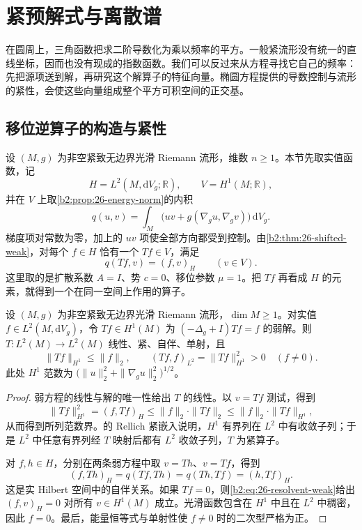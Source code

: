 \section{紧预解式与离散谱}
\label{b2:sec:2605}

在圆周上，三角函数把求二阶导数化为乘以频率的平方。一般紧流形没有统一的直线坐标，因而也没有现成的指数函数。我们可以反过来从方程寻找它自己的频率：先把源项送到解，再研究这个解算子的特征向量。椭圆方程提供的导数控制与流形的紧性，会使这些向量组成整个平方可积空间的正交基。

\subsection{移位逆算子的构造与紧性}
\label{b2:subsec:260501}

设 \((M,g)\) 为非空紧致无边界光滑 Riemann 流形，维数 \(n\geq1\)。本节先取实值函数，记
\[
 H=L^2(M,\mathrm dV_g;\mathbb R),\qquad V=H^1(M;\mathbb R),
\]
并在 \(V\) 上取\cref{b2:prop:26-energy-norm}的内积
\[
 q(u,v)=\int_M\bigl(uv+g(\nabla_g u,\nabla_g v)\bigr)\,\mathrm dV_g.
\]
梯度项对常数为零，加上的 \(uv\) 项使全部方向都受到控制。由\cref{b2:thm:26-shifted-weak}，对每个 \(f\in H\) 恰有一个 \(Tf\in V\)，满足
\begin{equation}\label{b2:eq:26-resolvent-weak}
 q(Tf,v)=(f,v)_H\qquad(v\in V).
\end{equation}
这里取的是扩散系数 \(A=I\)、势 \(c=0\)、移位参数 \(\mu=1\)。把 \(Tf\) 再看成 \(H\) 的元素，就得到一个在同一空间上作用的算子。

\begin{proposition}[正移位解算子的紧性]\label{b2:prop:26-compact-resolvent}
设 \((M,g)\) 为非空紧致无边界光滑 Riemann 流形，\(\dim M\geq1\)。对实值 \(f\in L^2(M,\mathrm dV_g)\)，令 \(Tf\in H^1(M)\) 为 \((-\Delta_g+I)Tf=f\) 的弱解。则 \(T:L^2(M)\rightarrow L^2(M)\) 线性、紧、自伴、单射，且
\[
 \|Tf\|_{H^1}\leq\|f\|_2,\qquad
 (Tf,f)_{L^2}=\|Tf\|_{H^1}^2>0\quad(f\ne0).
\]
此处 \(H^1\) 范数为 \(\bigl(\|u\|_2^2+\|\nabla_g u\|_2^2\bigr)^{1/2}\)。
\end{proposition}
\begin{proof}
弱方程的线性与解的唯一性给出 \(T\) 的线性。以 \(v=Tf\) 测试，得到
\[
 \|Tf\|_{H^1}^2=(f,Tf)_H
 \leq\|f\|_2\cdot\|Tf\|_2
 \leq\|f\|_2\cdot\|Tf\|_{H^1},
\]
从而得到所列范数界。的 Rellich 紧嵌入说明，\(H^1\) 有界列在 \(L^2\) 中有收敛子列；于是 \(L^2\) 中任意有界列经 \(T\) 映射后都有 \(L^2\) 收敛子列，\(T\) 为紧算子。

对 \(f,h\in H\)，分别在两条弱方程中取 \(v=Th\)、\(v=Tf\)，得到
\[
 (f,Th)_H=q(Tf,Th)=q(Th,Tf)=(h,Tf)_H.
\]
这是实 Hilbert 空间中的自伴关系。如果 \(Tf=0\)，则\eqref{b2:eq:26-resolvent-weak}给出 \((f,v)_H=0\) 对所有 \(v\in H^1(M)\) 成立。光滑函数包含在 \(H^1\) 中且在 \(L^2\) 中稠密，因此 \(f=0\)。最后，能量恒等式与单射性使 \(f\ne0\) 时的二次型严格为正。
\end{proof}

